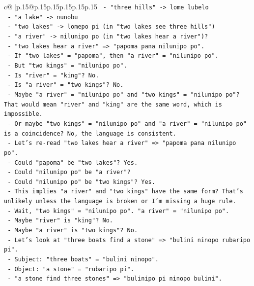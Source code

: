 \documentclass{article}
\begin{document}
{\begin{supertabular}{c@{$\;$}|p{.15\linewidth}@{}p{.15\linewidth}p{.15\linewidth}p{.15\linewidth}p{.15\linewidth}p{.15\linewidth}}
{{{\texttt{  {-} "three hills" {-}> lome lubelo} \\
\texttt{  {-} "a lake" {-}> nunobu} \\
\texttt{  {-} "two lakes" {-}> lomepo pi (in "two lakes see three hills")} \\
\texttt{  {-} "a river" {-}> nilunipo po (in "two lakes hear a river")?} \\
\texttt{    {-} "two lakes hear a river" => "papoma pana nilunipo po".} \\
\texttt{    {-} If "two lakes" = "papoma", then "a river" = "nilunipo po".} \\
\texttt{    {-} But "two kings" = "nilunipo po".} \\
\texttt{    {-} Is "river" = "king"? No.} \\
\texttt{    {-} Is "a river" = "two kings"? No.} \\
\texttt{    {-} Maybe "a river" = "nilunipo po" and "two kings" = "nilunipo po"? That would mean "river" and "king" are the same word, which is impossible.} \\
\texttt{    {-} Or maybe "two kings" = "nilunipo po" and "a river" = "nilunipo po" is a coincidence? No, the language is consistent.} \\
\texttt{    {-} Let's re{-}read "two lakes hear a river" => "papoma pana nilunipo po".} \\
\texttt{    {-} Could "papoma" be "two lakes"? Yes.} \\
\texttt{    {-} Could "nilunipo po" be "a river"?} \\
\texttt{    {-} Could "nilunipo po" be "two kings"? Yes.} \\
\texttt{    {-} This implies "a river" and "two kings" have the same form? That's unlikely unless the language is broken or I'm missing a huge rule.} \\
\texttt{    {-} Wait, "two kings" = "nilunipo po". "a river" = "nilunipo po".} \\
\texttt{    {-} Maybe "river" is "king"? No.} \\
\texttt{    {-} Maybe "a river" is "two kings"? No.} \\
\texttt{    {-} Let's look at "three boats find a stone" => "bulini ninopo rubaripo pi".} \\
\texttt{      {-} Subject: "three boats" = "bulini ninopo".} \\
\texttt{      {-} Object: "a stone" = "rubaripo pi".} \\
\texttt{    {-} "a stone find three stones" => "bulinipo pi ninopo bulini".} \\
}}}
\end{supertabular}}
\end{document}
